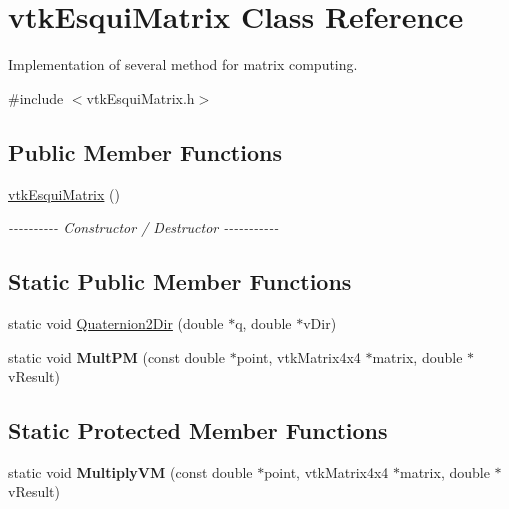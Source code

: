 \hypertarget{classvtkEsquiMatrix}{
\section{vtkEsquiMatrix Class Reference}
\label{classvtkEsquiMatrix}
}


Implementation of several method for matrix computing.  


{\ttfamily \#include $<$vtkEsquiMatrix.h$>$}\subsection*{Public Member Functions}
\begin{DoxyCompactItemize}
\item 
\hypertarget{classvtkEsquiMatrix_a76826f51a634a59ff505258f9b2d59c0}{
\hyperlink{classvtkEsquiMatrix_a76826f51a634a59ff505258f9b2d59c0}{vtkEsquiMatrix} ()}
\label{classvtkEsquiMatrix_a76826f51a634a59ff505258f9b2d59c0}

\begin{DoxyCompactList}\small\item\em -\/-\/-\/-\/-\/-\/-\/-\/-\/-\/ Constructor / Destructor -\/-\/-\/-\/-\/-\/-\/-\/-\/-\/-\/ \item\end{DoxyCompactList}\end{DoxyCompactItemize}
\subsection*{Static Public Member Functions}
\begin{DoxyCompactItemize}
\item 
static void \hyperlink{classvtkEsquiMatrix_a57a339771fe24ae2dad4660910c61c3b}{Quaternion2Dir} (double $\ast$q, double $\ast$vDir)
\item 
\hypertarget{classvtkEsquiMatrix_aba8bbc982531b316abe43077c7919052}{
static void {\bfseries MultPM} (const double $\ast$point, vtkMatrix4x4 $\ast$matrix, double $\ast$vResult)}
\label{classvtkEsquiMatrix_aba8bbc982531b316abe43077c7919052}

\end{DoxyCompactItemize}
\subsection*{Static Protected Member Functions}
\begin{DoxyCompactItemize}
\item 
\hypertarget{classvtkEsquiMatrix_a2b9f13f2fab0c444c0aa3f99b1143550}{
static void {\bfseries MultiplyVM} (const double $\ast$point, vtkMatrix4x4 $\ast$matrix, double $\ast$vResult)}
\label{classvtkEsquiMatrix_a2b9f13f2fab0c444c0aa3f99b1143550}

\end{DoxyCompactItemize}


